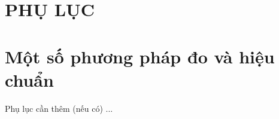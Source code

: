 \section*{PHỤ LỤC}

    \setcounter{section}{0}
    \setcounter{subsection}{0}
        \setcounter{figure}{0}
            \setcounter{table}{0}

\appendix



\section{Một số phương pháp đo và hiệu chuẩn}


Phụ lục cần thêm (nếu có)
...

